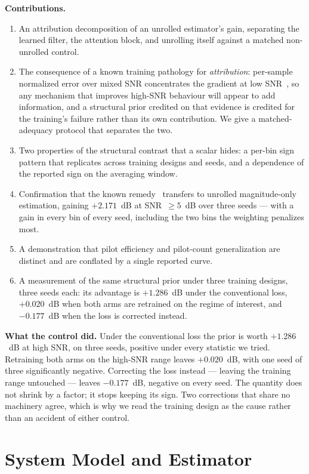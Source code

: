 \documentclass[journal]{IEEEtran}
\begin{document}
\textbf{Contributions.}
\begin{enumerate}
\item An attribution decomposition of an unrolled estimator's gain, separating
the learned filter, the attention block, and unrolling itself against a matched
non-unrolled control.
\item The consequence of a known training pathology for \emph{attribution}:
per-sample normalized error over mixed SNR concentrates the gradient at low
SNR~\cite{wiesmayr2023bler}, so any mechanism that improves high-SNR behaviour
will appear to add information, and a structural prior credited on that
evidence is credited for the training's failure rather than its own
contribution. We give a matched-adequacy protocol that separates the two.
\item Two properties of the structural contrast that a scalar hides: a per-bin
sign pattern that replicates across training designs and seeds, and a
dependence of the reported sign on the averaging window.
\item Confirmation that the known remedy~\cite{wiesmayr2023bler} transfers to
unrolled magnitude-only estimation, gaining $+2.171$~dB at SNR~$\ge5$~dB over
three seeds --- with a gain in every bin of every seed, including the two bins
the weighting penalizes most.
\item A demonstration that pilot efficiency and pilot-count generalization are
distinct and are conflated by a single reported curve.
\item A measurement of the same structural prior under three training
designs, three seeds each: its advantage is $+1.286$~dB under the conventional
loss, $+0.020$~dB when both arms are retrained on the regime of interest, and
$-0.177$~dB when the loss is corrected instead.
\end{enumerate}

\textbf{What the control did.} Under the conventional loss the prior is worth
$+1.286$~dB at high SNR, on three seeds, positive under every statistic we
tried. Retraining both arms on the high-SNR range leaves $+0.020$~dB, with one
seed of three significantly negative. Correcting the loss instead --- leaving
the training range untouched --- leaves $-0.177$~dB, negative on every seed.
The quantity does not shrink by a factor; it stops keeping its sign. Two
corrections that share no machinery agree, which is why we read the training
design as the cause rather than an accident of either control.

\section{System Model and Estimator}
\end{document}
